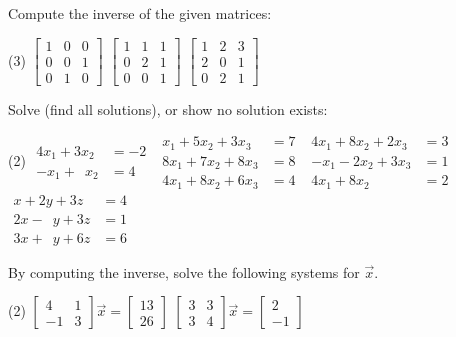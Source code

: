 \begin{exercise}
Compute the inverse of the given matrices:
\begin{tasks}(3)
\task
$\begin{bmatrix}
1 & 0 & 0 \\
0 & 0 & 1 \\
0 & 1 & 0
\end{bmatrix}$
\task
$\begin{bmatrix}
1 & 1 & 1 \\
0 & 2 & 1 \\
0 & 0 & 1
\end{bmatrix}$
\task
$\begin{bmatrix}
1 & 2 & 3 \\
2 & 0 & 1 \\
0 & 2 & 1
\end{bmatrix}$
\end{tasks}
\end{exercise}

\begin{exercise}
Solve (find all solutions), or show no solution exists:
\begin{tasks}(2)
\task
$\begin{aligned}
 4x_1+3x_2 & = -2 \\
 -x_1+\phantom{3} x_2 & = 4
\end{aligned}$
\task
$\begin{aligned}
  x_1+5x_2+3x_3 & = 7 \\
 8x_1+7x_2+8x_3 & = 8 \\
 4x_1+8x_2+6x_3 & = 4
\end{aligned}$
\task
$\begin{aligned}
 4x_1+8x_2+2x_3 & = 3 \\
 -x_1-2x_2+3x_3 & = 1 \\
 4x_1+8x_2 \phantom{{}+3x_3} & = 2
\end{aligned}$
\task
$\begin{aligned}
  x+2y+3z & = 4 \\
2  x-\phantom{2} y+3z & = 1 \\
3  x+\phantom{2} y+6z & = 6
\end{aligned}$
\end{tasks}
\end{exercise}

\begin{exercise}
By computing the inverse,
solve the following systems for $\vec{x}$.
\begin{tasks}(2)
\task
$\begin{bmatrix}
4 & 1 \\
-1 & 3
\end{bmatrix} \vec{x} =
\begin{bmatrix} 13 \\ 26 \end{bmatrix}$
\task
$\begin{bmatrix}
3 & 3 \\
3 & 4
\end{bmatrix} \vec{x} =
\begin{bmatrix} 2 \\ -1 \end{bmatrix}$
\end{tasks}
\end{exercise}

